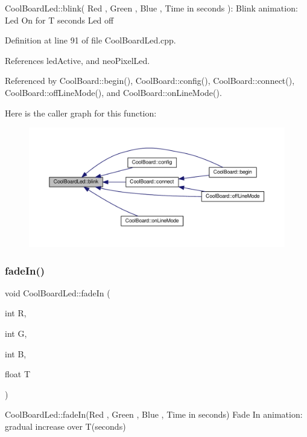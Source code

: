 Cool\+Board\+Led\+::blink( Red , Green , Blue , Time in seconds )\+: Blink animation\+: Led On for T seconds Led off 

Definition at line 91 of file Cool\+Board\+Led.\+cpp.



References led\+Active, and neo\+Pixel\+Led.



Referenced by Cool\+Board\+::begin(), Cool\+Board\+::config(), Cool\+Board\+::connect(), Cool\+Board\+::off\+Line\+Mode(), and Cool\+Board\+::on\+Line\+Mode().

Here is the caller graph for this function\+:
\nopagebreak
\begin{figure}[H]
\begin{center}
\leavevmode
\includegraphics[width=350pt]{de/dc0/class_cool_board_led_a96e1ea13003eee34c9dbcef340404426_icgraph}
\end{center}
\end{figure}
\mbox{\label{class_cool_board_led_ab778f5e7bed0ab74e3906d82110493c3}} 
\subsubsection{\texorpdfstring{fade\+In()}{fadeIn()}}
{\footnotesize\ttfamily void Cool\+Board\+Led\+::fade\+In (\begin{DoxyParamCaption}\item[{int}]{R,  }\item[{int}]{G,  }\item[{int}]{B,  }\item[{float}]{T }\end{DoxyParamCaption})}

Cool\+Board\+Led\+::fade\+In(\+Red , Green , Blue , Time in seconds) Fade In animation\+: gradual increase over T(seconds) 

